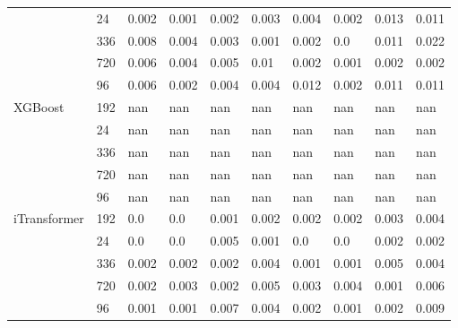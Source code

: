\begin{tabular}{llllllllll}
 & 24 & 0.002 & 0.001 & 0.002 & 0.003 & 0.004 & 0.002 & 0.013 & 0.011 \\
 & 336 & 0.008 & 0.004 & 0.003 & 0.001 & 0.002 & 0.0 & 0.011 & 0.022 \\
 & 720 & 0.006 & 0.004 & 0.005 & 0.01 & 0.002 & 0.001 & 0.002 & 0.002 \\
 & 96 & 0.006 & 0.002 & 0.004 & 0.004 & 0.012 & 0.002 & 0.011 & 0.011 \\
\cline{1-10}
\multirow[t]{5}{*}{XGBoost} & 192 & nan & nan & nan & nan & nan & nan & nan & nan \\
 & 24 & nan & nan & nan & nan & nan & nan & nan & nan \\
 & 336 & nan & nan & nan & nan & nan & nan & nan & nan \\
 & 720 & nan & nan & nan & nan & nan & nan & nan & nan \\
 & 96 & nan & nan & nan & nan & nan & nan & nan & nan \\
\cline{1-10}
\multirow[t]{5}{*}{iTransformer} & 192 & 0.0 & 0.0 & 0.001 & 0.002 & 0.002 & 0.002 & 0.003 & 0.004 \\
 & 24 & 0.0 & 0.0 & 0.005 & 0.001 & 0.0 & 0.0 & 0.002 & 0.002 \\
 & 336 & 0.002 & 0.002 & 0.002 & 0.004 & 0.001 & 0.001 & 0.005 & 0.004 \\
 & 720 & 0.002 & 0.003 & 0.002 & 0.005 & 0.003 & 0.004 & 0.001 & 0.006 \\
 & 96 & 0.001 & 0.001 & 0.007 & 0.004 & 0.002 & 0.001 & 0.002 & 0.009 \\
\cline{1-10}
\bottomrule
\end{tabular}
